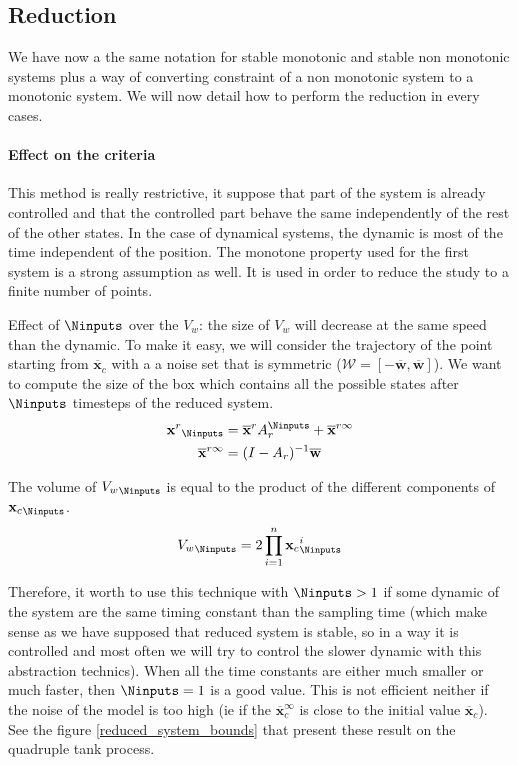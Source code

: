 \subsection{Reduction}
We have now a the same notation for stable monotonic and stable non monotonic systems plus a way of converting constraint of a non monotonic system to a monotonic system. We will now detail how to perform the reduction in every cases.

\paragraph{Effect on the criteria} This method is really restrictive, it suppose that part of the system is already controlled and that the controlled part behave the same independently of the rest of the other states. In the case of dynamical systems, the dynamic is most of the time independent of the position. 
The monotone property used for the first system is a strong assumption as well. It is used in order to reduce the study to a finite number of points.


Effect of $\Ninputs$ over the $V_w$: the size of $V_w$ will decrease at the same speed than the dynamic. To make it easy, we will consider the trajectory of the point starting from $\overline{\mathbf{x}}_c$ with a a noise set that is symmetric ($\mathcal{W} = \left [ -\overline{\mathbf{w}},\overline{\mathbf{w}} \right ]$). We want to compute the size of the box which contains all the possible states after $\Ninputs$ timesteps of the reduced system.
\begin{equation}
\begin{split}
{\mathbf{x}^r}_{\Ninputs} &= \overline{\mathbf{x}}^r A_r^{\Ninputs} + \overline{\mathbf{x}}^{r \infty}\\
\overline{\mathbf{x}}^{r \infty} &= (I-A_r)^{-1}\overline{\mathbf{w}}
\end{split}
\end{equation}

The volume of ${V_w}_{\Ninputs}$ is equal to the product of the different components of ${\mathbf{x}_c}_{\Ninputs}$.
\begin{equation}
{V_w}_{\Ninputs} = 2 \prod_{i=1}^n
{\mathbf{x}_c}_{\Ninputs}^i
\end{equation}

Therefore, it worth to use this technique with $\Ninputs>1$ if some dynamic of the system are the same timing constant than the sampling time (which make sense as we have supposed that reduced system is stable, so in a way it is controlled and most often we will try to control the slower dynamic with this abstraction technics). When all the time constants are either much smaller or much faster, then $\Ninputs = 1$ is a good value.
This is not efficient neither if the noise of the model is too high (ie if the $\overline{\mathbf{x}}_c^{\infty}$ is close to the initial value $\overline{\mathbf{x}}_c$). See the figure \ref{reduced_system_bounds} that present these result on the quadruple tank process.


